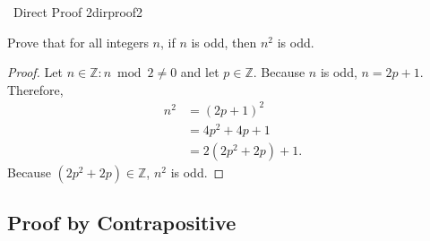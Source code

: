         \begin{exercise}{\Difficulty\,\Difficulty\,\,Direct Proof 2}{dirproof2}
        
        Prove that for all integers \(n\), if \(n\) is odd, then \(n^2\) is odd.
        
        \begin{proof}
            Let \(n\in\mathbb{Z}:n\bmod2\neq0\) and let \(p\in\mathbb{Z}\). Because \(n\) is odd, \(n=2p+1\). Therefore,
            \begin{align*}
                n^2&=(2p+1)^2 \\
                &=4p^2+4p+1 \\
                &=2(2p^2+2p)+1.
            \end{align*}
            Because \((2p^2+2p)\in\mathbb{Z}\), \(n^2\) is odd.
        \end{proof}
        
        \end{exercise}
    
    \subsection{Proof by Contrapositive}
    
